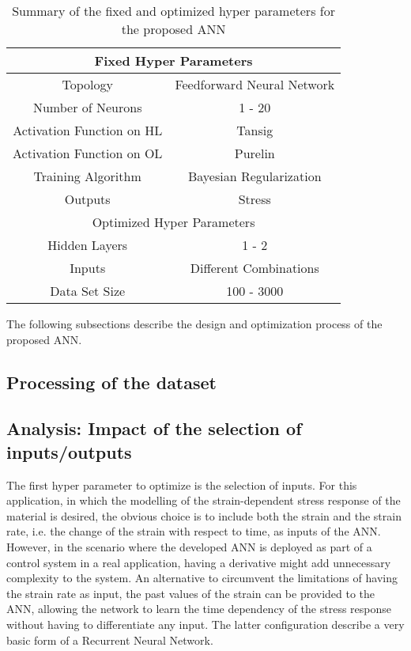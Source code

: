 \begin{table}[!t]
    \centering
    \caption{Summary of the fixed and optimized hyper parameters for the proposed ANN}
    \begin{tabular}{|c|c|}
    \hline
    \multicolumn{2}{|c|}{Fixed Hyper Parameters} \\
    \hline
    Topology                    & Feedforward Neural Network \\
    Number of Neurons           & 1 - 20 \\
    Activation Function on HL   & Tansig\\
    Activation Function on OL   & Purelin\\
    Training Algorithm          & Bayesian Regularization\\
    Outputs                     & Stress\\
    \hline
    \multicolumn{2}{|c|}{Optimized Hyper Parameters}\\
    \hline
    Hidden Layers               & 1 - 2 \\
    Inputs                      & Different Combinations\\
    Data Set Size               & 100 - 3000\\
    \hline
    \end{tabular}
    \label{tbl:ANN_parameters}
\end{table}

The following subsections describe the design and optimization process of the proposed ANN.

\subsection{Processing of the dataset}

\subsection{Analysis: Impact of the selection of inputs/outputs}

The first hyper parameter to optimize is the selection of inputs. For this application, in which the modelling of the strain-dependent stress response of the material is desired, the obvious choice is to include both the strain and the strain rate, i.e. the change of the strain with respect to time, as inputs of the ANN. However, in the scenario where the developed ANN is deployed as part of a control system in a real application, having a derivative might add unnecessary complexity to the system. An alternative to circumvent the limitations of having the strain rate as input, the past values of the strain can be provided to the ANN, allowing the network to learn the time dependency of the stress response without having to differentiate any input. The latter configuration describe a very basic form of a Recurrent Neural Network. 


